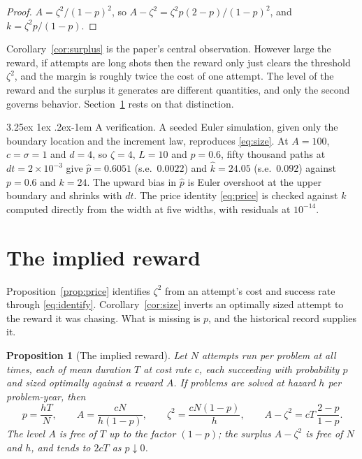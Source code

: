 \documentclass[11pt]{article}
\makeatletter
\renewcommand\paragraph{\@startsection{paragraph}{4}{\z@}%
  {3.25ex \@plus1ex \@minus.2ex}{-1em}%
  {\normalfont\normalsize\itshape}}
\theoremstyle{itheads}
\newtheorem{proposition}{Proposition}
\makeatother
\begin{document}
\begin{proof}
$A=\zeta^{2}/(1-p)^{2}$, so
$A-\zeta^{2}=\zeta^{2}p(2-p)/(1-p)^{2}$, and $k=\zeta^{2}p/(1-p)$.
\end{proof}

Corollary~\ref{cor:surplus} is the paper's central observation. However
large the reward, if attempts are long shots then the reward only
just clears the threshold $\zeta^{2}$, and the margin is roughly twice the
cost of one attempt. The level of the reward and the surplus it generates are
different quantities, and only the second governs behavior.
Section~\ref{sec:invert} rests on that distinction.

\paragraph{A verification.}
A seeded Euler simulation, given only the boundary location and the
increment law, reproduces \eqref{eq:size}. At $A=100$, $c=\sigma=1$ and
$d=4$, so $\zeta=4$, $L=10$ and $p=0.6$, fifty thousand paths at
$dt=2\times10^{-3}$ give $\hat p=0.6051$ (s.e.\ $0.0022$) and
$\hat k=24.05$ (s.e.\ $0.092$) against $p=0.6$ and $k=24$. The upward bias
in $\hat p$ is Euler overshoot at the upper boundary and shrinks with
$dt$. The price identity \eqref{eq:price} is checked against $k$ computed
directly from the width at five widths, with residuals at $10^{-14}$.

\section{The implied reward}
\label{sec:invert}

Proposition~\ref{prop:price} identifies $\zeta^{2}$ from an attempt's cost
and success rate through \eqref{eq:identify}. Corollary~\ref{cor:size} inverts an optimally sized
attempt to the reward it was chasing. What is missing is $p$, and the
historical record supplies it.

\begin{proposition}[The implied reward]\label{prop:invert}
Let $N$ attempts run per problem at all times, each of mean duration $T$ at
cost rate $c$, each succeeding with probability $p$ and sized optimally
against a reward $A$. If problems are solved at hazard $h$ per
problem-year, then
\begin{equation}
p=\frac{hT}{N},
\qquad
A=\frac{cN}{h(1-p)},
\qquad
\zeta^{2}=\frac{cN(1-p)}{h},
\qquad
A-\zeta^{2}=cT\,\frac{2-p}{1-p}.
\label{eq:invert}
\end{equation}
The level $A$ is free of $T$ up to the factor $(1-p)$; the surplus
$A-\zeta^{2}$ is free of $N$ and $h$, and tends to $2cT$ as $p\downarrow0$.
\end{proposition}
\end{document}
